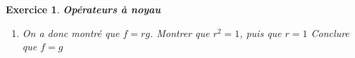 \documentclass[a4paper,11pt]{article}
\newtheorem{exer}{Exercice} %
\begin{document}
\begin{exer}{\textbf{Opérateurs à noyau}}
\begin{enumerate}
\begin{enumerate}
\item Montrer que si $x \in[0,1]$ , $T(f-r g)(x) > 0$ puis $T^2(f-r g)(x)>0$ ($T^2 = T \circ T$)
\item En déduire enfin que $f - rg > 0$ et conclure à une absurdité
\end{enumerate}
\item On a donc montré que $f = rg$. Montrer que $r^2 = 1$, puis que $r=1$
Conclure que $f=g$
\end{enumerate}
\end{exer} 

\end{document}
